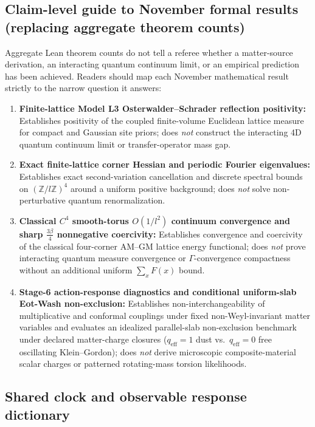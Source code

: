\documentclass[
  american,
  11pt,
  letterpaper,
]{article}
\providecommand{\tightlist}{%
  \setlength{\itemsep}{0pt}\setlength{\parskip}{0pt}}
\begin{document}
\subsection{Claim-level guide to November formal results (replacing aggregate theorem counts)}\label{claim-level-guide-to-november-formal-results-replacing-aggregate-theorem-counts}

Aggregate Lean theorem counts do not tell a referee whether a matter-source derivation, an interacting quantum continuum limit, or an empirical prediction has been achieved. Readers should map each November mathematical result strictly to the narrow question it answers:

\begin{enumerate}
\def\labelenumi{\arabic{enumi}.}
\tightlist
\item
  \textbf{Finite-lattice Model L3 Osterwalder--Schrader reflection positivity:} Establishes positivity of the coupled finite-volume Euclidean lattice measure for compact and Gaussian site priors; does \emph{not} construct the interacting 4D quantum continuum limit or transfer-operator mass gap.
\item
  \textbf{Exact finite-lattice corner Hessian and periodic Fourier eigenvalues:} Establishes exact second-variation cancellation and discrete spectral bounds on \((\mathbb{Z}/l\mathbb{Z})^4\) around a uniform positive background; does \emph{not} solve non-perturbative quantum renormalization.
\item
  \textbf{Classical \(C^4\) smooth-torus \(O(1/l^2)\) continuum convergence and sharp \(\frac{3\beta}{4}\) nonnegative coercivity:} Establishes convergence and coercivity of the classical four-corner AM--GM lattice energy functional; does \emph{not} prove interacting quantum measure convergence or \(\Gamma\)-convergence compactness without an additional uniform \(\sum_x F(x)\) bound.
\item
  \textbf{Stage-6 action-response diagnostics and conditional uniform-slab Eot-Wash non-exclusion:} Establishes non-interchangeability of multiplicative and conformal couplings under fixed non-Weyl-invariant matter variables and evaluates an idealized parallel-slab non-exclusion benchmark under declared matter-charge closures (\(q_{\mathrm{eff}} = 1\) dust vs.~\(q_{\mathrm{eff}} = 0\) free oscillating Klein--Gordon); does \emph{not} derive microscopic composite-material scalar charges or patterned rotating-mass torsion likelihoods.
\end{enumerate}

\subsection{Shared clock and observable response dictionary}\label{shared-clock-and-observable-response-dictionary}
\end{document}
